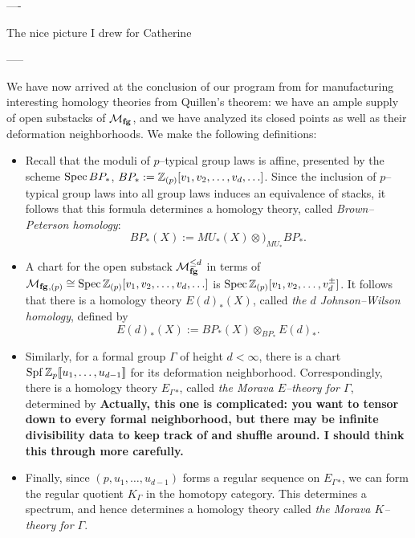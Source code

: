 
----

The nice picture I drew for Catherine

-----

We have now arrived at the conclusion of our program from  for manufacturing interesting homology theories from Quillen's theorem: we have an ample supply of open substacks of $\mathcal{M}_{\mathbf{fg}}$, and we have analyzed its closed points as well as their deformation neighborhoods.  We make the following definitions:
\begin{itemize}
\item Recall that the moduli of $p$--typical group laws is affine, presented by the scheme $\operatorname{Spec} BP_*$, $BP_* := \mathbb Z_{(p)}[v_1, v_2, \ldots, v_d, \ldots]$.  Since the inclusion of $p$--typical group laws into all group laws induces an equivalence of stacks, it follows that this formula determines a homology theory, called \textit{Brown--Peterson homology}: \[BP_*(X) := MU_*(X) \otimes)_{MU_*} BP_*.\]
\item A chart for the open substack $\mathcal{M}_{\mathbf{fg}}^{\le d}$ in terms of $\mathcal{M}_{\mathbf{fg}}{}_{,(p)} \cong \operatorname{Spec} \mathbb Z_{(p)}[v_1, v_2, \ldots, v_d, \ldots]$ is $\operatorname{Spec} \mathbb Z_{(p)}[v_1, v_2, \ldots, v_d^\pm]$.  It follows that there is a homology theory $E(d)_*(X)$, called \textit{the $d${\th} Johnson--Wilson homology}, defined by \[E(d)_*(X) := BP_*(X) \otimes_{BP_*} E(d)_*.\]
\item Similarly, for a formal group $\Gamma$ of height $d < \infty$, there is a chart $\operatorname{Spf} \mathbb Z_p\llbracket{u_1, \ldots, u_{d-1}}\rrbracket$ for its deformation neighborhood.  Correspondingly, there is a homology theory $E_\Gamma{}_*$, called \textit{the Morava $E$--theory for $\Gamma$}, determined by \textbf{Actually, this one is complicated: you want to tensor down to every formal neighborhood, but there may be infinite divisibility data to keep track of and shuffle around.  I should think this through more carefully.}
\item Finally, since $(p, u_1, \ldots, u_{d-1})$ forms a regular sequence on $E_\Gamma{}_*$, we can form the regular quotient $K_\Gamma$ in the homotopy category.  This determines a spectrum, and hence determines a homology theory called \textit{the Morava $K$--theory for $\Gamma$}.
\end{itemize}

